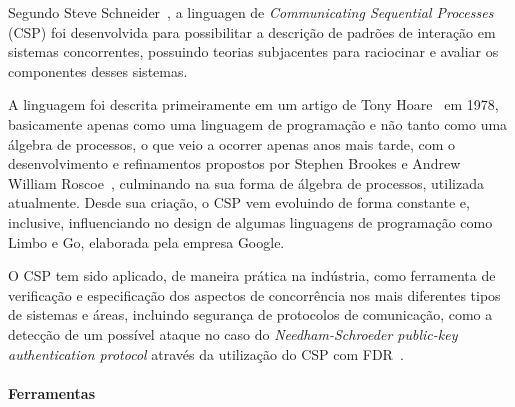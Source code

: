 Segundo Steve Schneider~\cite{Schneider:1999:CRT:555233}, a linguagen de \textit{Communicating Sequential Processes}
(CSP) foi desenvolvida para possibilitar a descrição de padrões de interação em sistemas concorrentes,
possuindo teorias subjacentes para raciocinar e avaliar os componentes desses sistemas.

A linguagem foi descrita primeiramente em um artigo de Tony Hoare~\cite{Hoare:1978:CSP:359576.359585} em 1978,
basicamente apenas como uma linguagem de programação e não tanto como uma álgebra de processos, o que veio a ocorrer
apenas anos mais tarde, com o desenvolvimento e refinamentos propostos por Stephen Brookes e Andrew William Roscoe~\cite{Brookes:1984:TCS:828.833},
culminando na sua forma de álgebra de processos, utilizada atualmente.
Desde sua criação, o CSP vem evoluindo de forma constante e, inclusive, influenciando no design de algumas linguagens
de programação como Limbo e Go, elaborada pela empresa Google.

O CSP tem sido aplicado, de maneira prática na indústria, como ferramenta de verificação e especificação dos aspectos
de concorrência nos mais diferentes tipos de sistemas e áreas, incluindo segurança de protocolos de comunicação,
como a detecção de um possível ataque no caso do \textit{Needham-Schroeder public-key authentication protocol}
através da utilização do CSP com FDR~\cite{Lowe:1996:BFN:646480.693776}.

\paragraph{Ferramentas}

